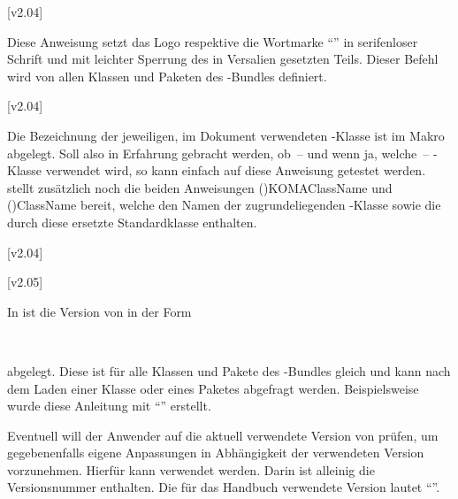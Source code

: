 \begin{Declaration}
  {}
  [v2.04]
\printdeclarationlist

Diese Anweisung setzt das Logo respektive die Wortmarke \enquote{\TUDScript{}} 
in serifenloser Schrift und mit leichter Sperrung des in Versalien gesetzten 
Teils. Dieser Befehl wird von allen Klassen und Paketen des \TUDScript-Bundles 
definiert.
\end{Declaration}

\begin{Declaration}
  {}
  [v2.04]
\printdeclarationlist

Die Bezeichnung der jeweiligen, im Dokument verwendeten \TUDScript-Klasse ist 
im Makro  abgelegt. Soll also in Erfahrung gebracht 
werden, ob~-- und wenn ja, welche~-- \TUDScript-Klasse verwendet wird, so kann 
einfach auf diese Anweisung getestet werden. \KOMAScript stellt zusätzlich 
noch die beiden Anweisungen \Macro*(){KOMAClassName} und 
\Macro*(){ClassName}
bereit, welche den Namen der zugrundeliegenden \KOMAScript-Klasse sowie die 
durch diese ersetzte Standardklasse enthalten.
\end{Declaration}

\begin{Declaration}
  {}
  [v2.04]
\begin{Declaration}
  {}
  [v2.05]
\printdeclarationlist

In  ist die Version von \TUDScript in der Form
\begin{quoting}
~~
\end{quoting}
abgelegt. Diese ist für alle Klassen und Pakete des \TUDScript-Bundles gleich 
und kann nach dem Laden einer Klasse oder eines Paketes abgefragt werden. 
Beispielsweise wurde diese Anleitung mit \enquote{\TUDScriptVersion} erstellt.

Eventuell will der Anwender auf die aktuell verwendete Version von \TUDScript 
prüfen, um gegebenenfalls eigene Anpassungen in Abhängigkeit der verwendeten 
Version vorzunehmen. Hierfür kann  verwendet 
werden. Darin ist alleinig die Versionsnummer enthalten. Die für das Handbuch 
verwendete Version lautet \enquote{\TUDScriptVersionNumber}.
\end{Declaration}
\end{Declaration}



